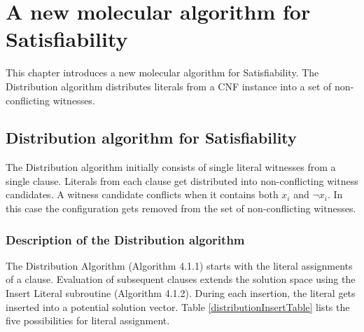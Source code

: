 
\chapter{A new molecular algorithm for {\sc Satisfiability}}

This chapter introduces a new molecular algorithm for {\sc Satisfiability}.  The Distribution algorithm distributes literals from a CNF instance into a set of non-conflicting witnesses.

\section{Distribution algorithm for {\sc Satisfiability}}

The Distribution algorithm initially consists of single literal witnesses from a single clause.  Literals from each clause get distributed into non-conflicting witness candidates.  A witness candidate conflicts when it contains both $x_i$ and $\neg x_i$.  In this case the configuration gets removed from the set of non-conflicting witnesses.  

	\subsection{Description of the Distribution algorithm}
		

The {\sc Distribution Algorithm} (Algorithm 4.1.1) starts with the literal assignments of a clause.  Evaluation of subsequent clauses extends the solution space using the {\sc Insert Literal} subroutine (Algorithm 4.1.2).  During each insertion, the literal gets inserted into a potential solution vector.  Table \ref{distributionInsertTable} lists the five possibilities for literal assignment.



\FloatBarrier
	
